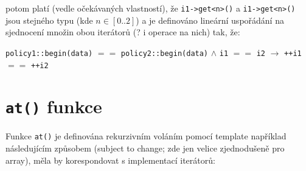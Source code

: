 \documentclass[a4paper,12pt]{article}
\begin{document}
    potom platí (vedle očekávaných vlastností), že \lstinline{i1->get<n>()} a \lstinline{i1->get<n>()} jsou stejného typu (kde $n \in [0..2]$) a je definováno lineární uspořádání na sjednocení množin obou iterátorů (? i operace na nich) tak, že:

    \begin{center}
        \lstinline{policy1::begin(data)} $==$ \lstinline{policy2::begin(data)} $\wedge$
    \lstinline{i1} $==$ \lstinline{i2} $\to$ \lstinline{++i1} $==$ \lstinline{++i2}
    \end{center}

    \section{\lstinline{at()} funkce}

    Funkce \lstinline{at()} je definována rekurzivním voláním pomocí template například následujícím způsobem (subject to change; zde jen velice zjednodušeně pro array), měla by korespondovat s implementací iterátorů:
    
\end{document}
